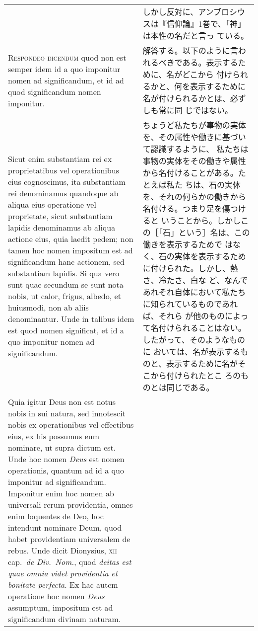 \documentclass[10pt]{jsarticle}
\begin{document}
\begin{longtable}{p{21em}p{21em}}
&

しかし反対に、アンブロシウスは『信仰論』1巻で、「神」は本性の名だと言っ
ている。

\\

{\scshape Respondeo dicendum} quod non est semper idem id a quo
imponitur nomen ad significandum, et id ad quod significandum nomen
imponitur.

&

解答する。以下のように言われるべきである。表示するために、名がどこから
付けられるかと、何を表示するために名が付けられるかとは、必ずしも常に同
じではない。

\\

Sicut enim substantiam rei ex proprietatibus vel operationibus eius
cognoscimus, ita substantiam rei denominamus quandoque ab aliqua eius
operatione vel proprietate, sicut substantiam lapidis denominamus ab
aliqua actione eius, quia laedit pedem; non tamen hoc nomen impositum
est ad significandum hanc actionem, sed substantiam lapidis. Si qua
vero sunt quae secundum se sunt nota nobis, ut calor, frigus, albedo,
et huiusmodi, non ab aliis denominantur. Unde in talibus idem est quod
nomen significat, et id a quo imponitur nomen ad significandum.

&

ちょうど私たちが事物の実体を、その属性や働きに基づいて認識するように、
私たちは事物の実体をその働きや属性から名付けることがある。たとえば私た
ちは、石の実体を、それの何らかの働きから名付ける。つまり足を傷つけると
いうことから。しかしこの［「石」という］名は、この働きを表示するためで
はなく、石の実体を表示するために付けられた。しかし、熱さ、冷たさ、白な
ど、なんであれそれ自体において私たちに知られているものであれば、それら
が他のものによって名付けられることはない。したがって、そのようなものに
おいては、名が表示するものと、表示するために名がそこから付けられたとこ
ろのものとは同じである。

\\

Quia igitur Deus non est notus nobis in sui natura, sed innotescit
nobis ex operationibus vel effectibus eius, ex his possumus eum
nominare, ut supra dictum est. Unde hoc nomen {\itshape Deus} est
nomen operationis, quantum ad id a quo imponitur ad
significandum. Imponitur enim hoc nomen ab universali rerum
providentia, omnes enim loquentes de Deo, hoc intendunt nominare Deum,
quod habet providentiam universalem de rebus. Unde dicit Dionysius,
{\scshape xii} cap.~{\itshape de Div.~Nom.}, quod {\itshape deitas est
quae omnia videt providentia et bonitate perfecta}. Ex hac autem
operatione hoc nomen {\itshape Deus} assumptum, impositum est ad
significandum divinam naturam.


\end{longtable}
\end{document}
